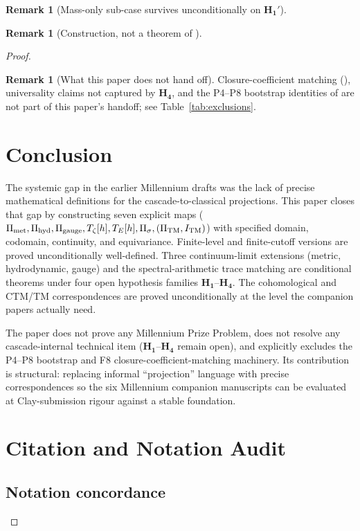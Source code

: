 \documentclass[11pt, a4paper]{amsart}
\theoremstyle{definition}
\newtheorem{remark}[theorem]{Remark}
\newcommand{\met}{{\rm met}}
\newcommand{\hyd}{{\rm hyd}}
\newcommand{\gge}{{\rm gauge}}
\newcommand{\TM}{{\rm TM}}
\begin{document}
\begin{remark}[Mass-only sub-case survives unconditionally on $\mathbf{H_1'}$]
\begin{remark}[Construction, not a theorem of \cite{CascadeEmbeddings}]
\begin{proof}
\begin{remark}[What this paper does not hand off]
Closure-coefficient matching (\cite[\S F8]{CascadeFoundations}),
universality claims not captured by $\mathbf{H_4}$, and the
P4--P8 bootstrap identities of \cite{CascadePregeometry} are not
part of this paper's handoff; see Table~\ref{tab:exclusions}.
\end{remark}

\section{Conclusion}
\label{sec:conclusion}

The systemic gap in the earlier Millennium drafts was the lack of
precise mathematical definitions for the cascade-to-classical
projections. This paper closes that gap by constructing seven
explicit maps ($\Pi_{\met}, \Pi_{\hyd}, \Pi_{\gge}, T_\zeta[h],
T_E[h], \Pi_\sigma, (\Pi_{\TM}, I_{\TM})$) with specified domain,
codomain, continuity, and equivariance. Finite-level and
finite-cutoff versions are proved unconditionally well-defined.
Three continuum-limit extensions (metric, hydrodynamic, gauge) and
the spectral-arithmetic trace matching are conditional theorems
under four open hypothesis families $\mathbf{H_1}$--$\mathbf{H_4}$.
The cohomological and CTM/TM correspondences are proved
unconditionally at the level the companion papers actually need.

The paper does not prove any Millennium Prize Problem, does not
resolve any cascade-internal technical item
($\mathbf{H_1}$--$\mathbf{H_4}$ remain open), and explicitly
excludes the P4--P8 bootstrap and F8 closure-coefficient-matching
machinery. Its contribution is structural: replacing informal
``projection'' language with precise correspondences so the six
Millennium companion manuscripts can be evaluated at
Clay-submission rigour against a stable foundation.

\appendix
\section{Citation and Notation Audit}
\label{app:audit}

\subsection{Notation concordance}


\end{proof}
\end{remark}
\end{remark}
\end{document}
